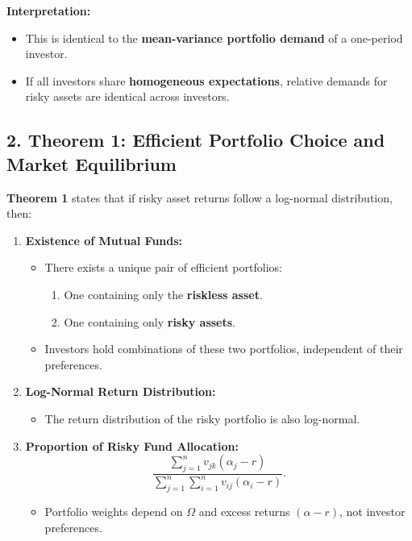 \documentclass{article}
\begin{document}
\textbf{Interpretation:}
\begin{itemize}
    \item This is identical to the \textbf{mean-variance portfolio demand} of a one-period investor.
    \item If all investors share \textbf{homogeneous expectations}, relative demands for risky assets are identical across investors.
\end{itemize}

\subsection*{2. Theorem 1: Efficient Portfolio Choice and Market Equilibrium}
\textbf{Theorem 1} states that if risky asset returns follow a log-normal distribution, then:
\begin{enumerate}
    \item \textbf{Existence of Mutual Funds:} 
    \begin{itemize}
        \item There exists a unique pair of efficient portfolios:
        \begin{enumerate}
            \item One containing only the \textbf{riskless asset}.
            \item One containing only \textbf{risky assets}.
        \end{enumerate}
        \item Investors hold combinations of these two portfolios, independent of their preferences.
    \end{itemize}
    
    \item \textbf{Log-Normal Return Distribution:}  
    \begin{itemize}
        \item The return distribution of the risky portfolio is also log-normal.
    \end{itemize}
    
    \item \textbf{Proportion of Risky Fund Allocation:}  
    \begin{equation}
    \frac{\sum_{j=1}^{n} v_{jk} (\alpha_j - r)}{\sum_{j=1}^{n} \sum_{i=1}^{n} v_{ij} (\alpha_i - r)}.
    \end{equation}
    \begin{itemize}
        \item Portfolio weights depend on \( \Omega \) and excess returns \( (\alpha - r) \), not investor preferences.
    \end{itemize}
\end{enumerate}
\end{document}
